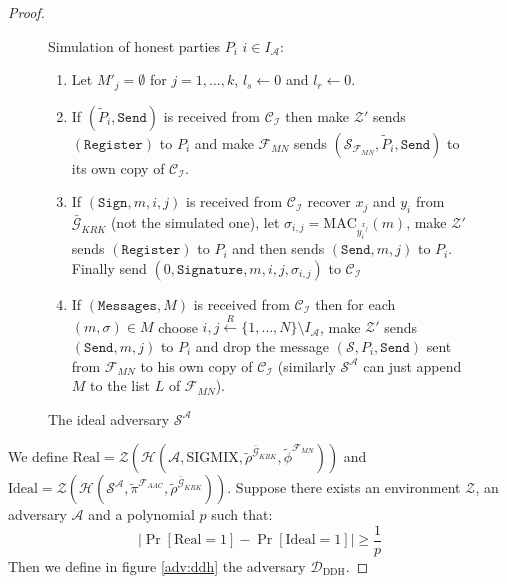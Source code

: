 \documentclass{acm_proc_article-sp}
\begin{document}
\begin{proof}
\begin{figure}
{\begin{minipage}[t]{1\columnwidth}
Simulation of honest parties $P_i$ $i \in I_\mathcal{A}$:
\begin{enumerate}
    \item Let $M'_j = \emptyset$ for $j = 1, \ldots, k$, $l_s \leftarrow 0$ and $l_r \leftarrow 0$.
    \item If  $(\tilde{P}_i, \mathtt{Send})$ is received from $\mathcal{C_I}$
          then make $\mathcal{Z}'$ sends $(\mathtt{Register})$ to $P_i$ and make $\mathcal{F}_{MN}$ sends
          $(\mathcal{S}_{\mathcal{F}_{MN}}, \tilde{P}_i, \mathtt{Send})$ to its own copy of $\mathcal{C_I}$.
    \item If $(\mathtt{Sign}, m, i, j)$ is received from $\mathcal{C_I}$ recover $x_j$ and $y_i$ from
          $\bar{\mathcal{G}}_{KRK}$ (not the simulated one), let $\sigma_{i,j} = \mathrm{MAC}_{y_i^{x_j}}(m)$,
          make $\mathcal{Z}'$ sends $(\mathtt{Register})$ to $P_i$ and then sends $(\mathtt{Send}, m, j)$ to
          $P_i$. Finally send $(0, \mathtt{Signature}, m, i, j, \sigma_{i,j})$ to $\mathcal{C_I}$
    \item If $(\mathtt{Messages}, M)$ is received from $\mathcal{C_I}$ then for each $(m, \sigma) \in M$
          choose $i, j \overset{R}{\leftarrow} \{1, \ldots, N\} \setminus I_\mathcal{A}$, make $\mathcal{Z}'$
          sends $(\mathtt{Send}, m, j)$ to $P_i$ and drop the message $(\mathcal{S}, P_i, \mathtt{Send})$ sent
          from $\mathcal{F}_{MN}$ to his own copy of $\mathcal{C_I}$ (similarly $\mathcal{S^A}$ can just append
          $M$ to the list $L$ of $\mathcal{F}_{MN}$).
\end{enumerate}
\end{minipage}}
\caption{The ideal adversary $\mathcal{S^A}$}
\label{adv_S_A}
\end{figure}

We define
$\mathrm{Real} = \mathcal{Z}(
                    \mathcal{H}(
                        \mathcal{A},
                        \mathrm{SIGMIX},
                        \tilde{\rho}^{\bar{\mathcal{G}}_{KRK}},
                        \tilde{\phi}^{\mathcal{F}_{MN}}))$
and
$\mathrm{Ideal} = \mathcal{Z}(
                    \mathcal{H}(
                        \mathcal{S^A},
                        \tilde{\pi}^{\mathcal{F}_{AAC}},
                        \tilde{\rho}^{\bar{\mathcal{G}}_{KRK}}))$.
Suppose there exists an environment $\mathcal{Z}$, an adversary $\mathcal{A}$ and a polynomial $p$ such that:
\begin{equation}
\left|
    \Pr[\mathrm{Real} = 1]
    - \Pr[\mathrm{Ideal} = 1]
\right| \geq \frac{1}{p}
\label{eq:guc}
\end{equation}
Then we define in figure \ref{adv:ddh} the adversary $\mathcal{D}_\textrm{DDH}$.


\end{proof}
\end{document}
